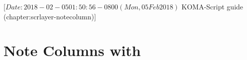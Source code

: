 %
%
%
%
%
%
%

                 [$Date: 2018-02-05 01:50:56 -0800 (Mon, 05 Feb 2018) $
                  KOMA-Script guide (chapter:scrlayer-notecolumn)]


\chapter{Note Columns with }

